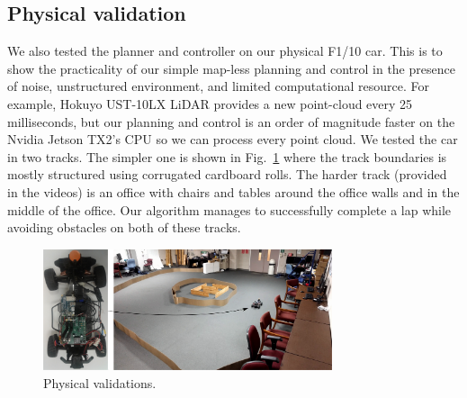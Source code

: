 \subsection{Physical validation}
We also tested the planner and controller on our physical F1/10 car.
%
This is to show the practicality of our simple map-less planning and control in the presence of noise, unstructured environment, and limited computational resource.
%
For example, Hokuyo UST-10LX LiDAR provides a new point-cloud every 25 milliseconds, but our planning and control is an order of magnitude faster on the Nvidia Jetson TX2's CPU so we can process every point cloud.
%
We tested the car in two tracks.
%
The simpler one is shown in Fig.~\ref{fig:physical_track} where the track boundaries is mostly structured using corrugated cardboard rolls.
%
The harder track (provided in the videos) is an office with chairs and tables around the office walls and in the middle of the office.
%
Our algorithm manages to successfully complete a lap while avoiding obstacles on both of these tracks.

\begin{figure}[!t]
\centering
\includegraphics[width=85mm]{Figures/physical_track.png}
\caption{Physical validations.}
\label{fig:physical_track}
\end{figure}


